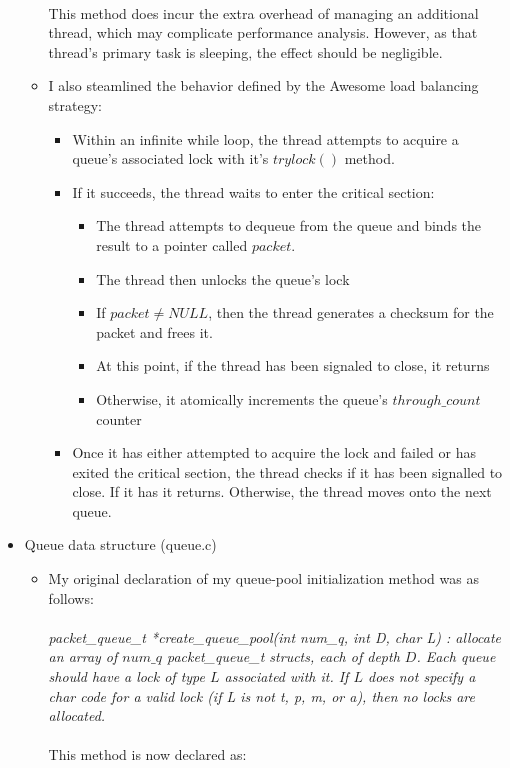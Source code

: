 \documentclass[]{article}
\begin{document}
\begin{itemize}
\begin{itemize}
		\\
		This method does incur the extra overhead of managing an additional thread, which may complicate performance analysis. However, as that thread's primary task is sleeping, the effect should be negligible.
		\item I also steamlined the behavior defined by the Awesome load balancing strategy:
		\begin{itemize}
			\item Within an infinite while loop, the thread attempts to acquire a queue's associated lock with it's $trylock()$ method.
			\item If it succeeds, the thread waits to enter the critical section:
			\begin{itemize}
				\item The thread attempts to dequeue from the queue and binds the result to a pointer called $packet$.
				\item The thread then unlocks the queue's lock
				\item If $packet \neq NULL$, then the thread generates a checksum for the packet and frees it.
				\item At this point, if the thread has been signaled to close, it returns
				\item Otherwise, it atomically increments the queue's $through\_count$ counter
			\end{itemize}
			\item Once it has either attempted to acquire the lock and failed or has exited the critical section, the thread checks if it has been signalled to close. If it has it returns. Otherwise, the thread moves onto the next queue.
		\end{itemize}
	\end{itemize}
	\item Queue data structure (queue.c)
	\begin{itemize}
		\item My original declaration of my queue-pool initialization method was as follows:
		\\\\
		\textit{packet\_queue\_t *create\_queue\_pool(int num\_q, int D, char L) : allocate an array of $num\_q$ packet\_queue\_t structs, each of depth $D$. Each queue should have a lock of type $L$ associated with it. If $L$ does not specify a char code for a valid lock (if L is not t, p, m, or a), then no locks are allocated.}
		\\\\
		This method is now declared as:

\end{itemize}
\end{itemize}
\end{document}
